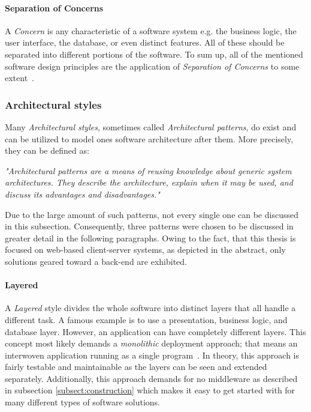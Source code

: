 \documentclass[12pt,a4paper,twoside]{report}
\begin{document}
\paragraph{Separation of Concerns}
A \textit{Concern} is any characteristic of a software system
e.g. the business logic, the user interface, the database, or even distinct features.
All of these should be separated into different portions of the software.
To sum up, all of the mentioned software design principles are the application
of \textit{Separation of Concerns} to some extent~\cite{mitchell-managing-se}.


\subsubsection{Architectural styles} \label{subsubsect:architectural-styles}

Many \textit{Architectural styles}, sometimes called \textit{Architectural patterns},
do exist and can be utilized to model ones software architecture after them.
More precisely, they can be defined as:
\begin{displayquote}
\emph{"Architectural patterns are a means of reusing knowledge about
generic system architectures. They describe the architecture,
explain when it may be used, and discuss its advantages and disadvantages."}~\cite{sommerville-se}
\end{displayquote}
Due to the large amount of such patterns, not every single one can be discussed
in this subsection. Consequently, three patterns were chosen to be discussed
in greater detail in the following paragraphs. Owing to the fact, that this
thesis is focused on web-based client-server systems, as depicted in the abstract,
only solutions geared toward a back-end are exhibited.

\paragraph{Layered}
A \textit{Layered} style divides the whole software into distinct layers that
all handle a different task. A famous example is to use a presentation,
business logic, and database layer. However, an application can have completely different
layers. This concept most likely demands a \textit{monolithic} deployment approach;
that means an interwoven application running as a single program~\cite{monolith}.
In theory, this approach is fairly testable and maintainable
as the layers can be seen and extended separately. Additionally, this approach demands
for no middleware as described in subsection \ref{subsect:construction} which
makes it easy to get started with for many different types of software solutions.
\end{document}
